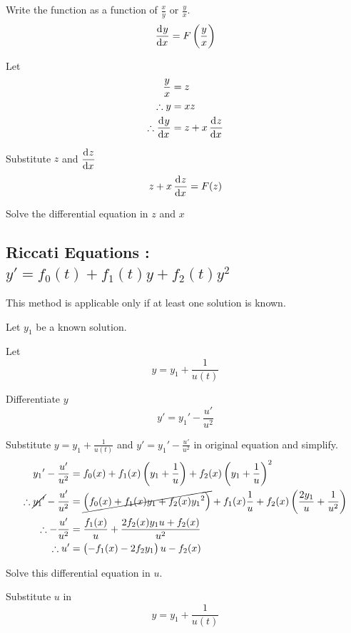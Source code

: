 \documentclass[fleqn, a4paper, 8pt, twoside]{amsart}
\theoremstyle{definition}
\theoremstyle{theorem}
\begin{document}
\begin{multicols}{2}
\begin{spacing}{0.85}
\begin{algorithmic}[1]
	\item 
		Write the function as a function of $\frac{x}{y}$ or $\frac{y}{x}$.
		\begin{equation*}
			\dod{y}{x} = F \left( \frac{y}{x} \right)
		\end{equation*}
	\item 
		Let
		\begin{align*}
			\frac{y}{x} &= z\\
			\therefore y &= x z\\
			\therefore \dod{y}{x} &= z + x \dod{z}{x}
		\end{align*}
	\item 
		Substitute $z$ and $\dod{z}{x}$
		\begin{equation*}
			z + x \dod{z}{x} = F(z)
		\end{equation*}
	\item
		Solve the differential equation in $z$ and $x$
\end{algorithmic}

\subsection{Riccati Equations : $y' = f_0(t) + f_1(t) y + f_2(t) y^2$}

This method is applicable only if at least one solution is known.
\begin{algorithmic}[1]
	\item Let $y_1$ be a known solution.
	\item 
		Let
		\begin{equation*}
			y = y_1 + \frac{1}{u(t)}
		\end{equation*}
	\item 
		Differentiate $y$
		\begin{equation*}
			y' = {y_1}' - \frac{u'}{u^2}
		\end{equation*}
	\item 
		Substitute $y = y_1 + \frac{1}{u(t)}$ and $y' = {y_1}' - \frac{u'}{u^2}$ in original equation and simplify.
		\begin{align*}
			{y_1}' - \frac{u'}{u^2} &= f_0(x) + f_1(x) \left( y_1 + \frac{1}{u} \right) + f_2(x) \left( y_1 + \frac{1}{u} \right)^2\\
			\therefore \cancel{{y_1}'} - \frac{u'}{u^2} &= \cancel{\left( f_0(x) + f_1(x) y_1 + f_2(x) {y_1}^2\right)} + f_1(x) \frac{1}{u} + f_2(x) \left( \frac{2 y_1}{u} + \frac{1}{u^2} \right)\\
			\therefore -\frac{u'}{u^2} &= \frac{f_1(x)}{u} + \frac{2 f_2(x) y_1 u + f_2(x)}{u^2}\\
			\therefore u' &= \left( -f_1(x) - 2 f_2 y_1 \right) u - f_2(x)
		\end{align*}
	\item 
		Solve this differential equation in $u$.
	\item 
		Substitute $u$ in 
		\begin{equation*}
			y = y_1 + \frac{1}{u(t)}
		\end{equation*}
\end{algorithmic}


\end{spacing}
\end{multicols}
\end{document}

